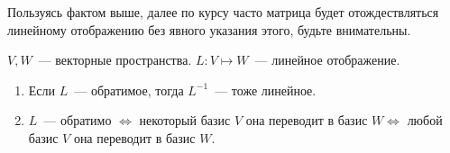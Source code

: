 \begin{remark}
    Пользуясь фактом выше, далее по курсу часто матрица будет отождествляться линейному отображению без явного
    указания этого, будьте внимательны.
\end{remark}
\begin{statement}
    $V,W$~--- векторные пространства. $L: V\mapsto W$~--- линейное отображение.
    \begin{enumerate}
        \item Если $L$~--- обратимое, тогда $L^{-1}$~--- тоже линейное.
        \item $L$~--- обратимо $\Leftrightarrow$ некоторый базис $V$ она переводит в базис $W\Leftrightarrow$ 
            любой базис $V$ она переводит в базис $W$.
    \end{enumerate}
\end{statement}
